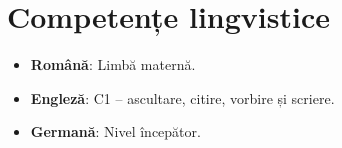 \documentclass[a4paper,11pt]{article}
\newcommand{\resumeItem}[2]{
  \item\small{
    \textbf{#1}{: #2 \vspace{-2pt}}
  }
}
\newcommand{\resumeSubItem}[2]{\resumeItem{#1}{#2}\vspace{-4pt}}
\newcommand{\resumeSubHeadingListStart}{\begin{itemize}[leftmargin=*]}
\newcommand{\resumeSubHeadingListEnd}{\end{itemize}}
\begin{document}
\section{Competențe lingvistice}
  \resumeSubHeadingListStart
    \resumeSubItem{Română}
      {Limbă maternă.}
    \resumeSubItem{Engleză}
      {C1 -- ascultare, citire, vorbire și scriere.}
    \resumeSubItem{Germană}
      {Nivel începător.}
  \resumeSubHeadingListEnd


\end{document}
